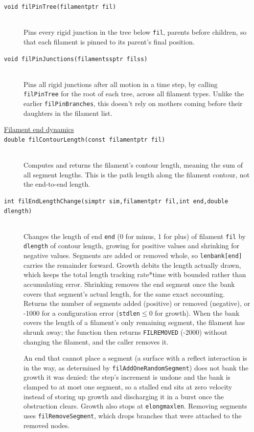 \documentclass {scrbook}
\newcommand {\ttt} {\texttt}
\begin{document}
\begin{description}
\item[\ttt{void filPinTree(filamentptr fil)}]
\hfill \\
Pins every rigid junction in the tree below \ttt{fil}, parents before children, so that each filament is pinned to its parent's final position.

\item[\ttt{void filPinJunctions(filamentssptr filss)}]
\hfill \\
Pins all rigid junctions after all motion in a time step, by calling \ttt{filPinTree} for the root of each tree, across all filament types. Unlike the earlier \ttt{filPinBranches}, this doesn't rely on mothers coming before their daughters in the filament list. %

\item[\underline{Filament end dynamics}]

\item[\ttt{double filContourLength(const filamentptr fil)}] %
\hfill \\
Computes and returns the filament's contour length, meaning the sum of all segment lengths. This is the path length along the filament contour, not the end-to-end length.

\item[\ttt{int filEndLengthChange(simptr sim,filamentptr fil,int end,double dlength)}] %
\hfill \\
Changes the length of end \ttt{end} (0 for minus, 1 for plus) of filament \ttt{fil} by \ttt{dlength} of contour length, growing for positive values and shrinking for negative values. Segments are added or removed whole, so \ttt{lenbank[end]} carries the remainder forward. Growth debits the length actually drawn, which keeps the total length tracking rate*time with bounded rather than accumulating error. Shrinking removes the end segment once the bank covers that segment's actual length, for the same exact accounting. Returns the number of segments added (positive) or removed (negative), or -1000 for a configuration error (\ttt{stdlen}$\leq 0$ for growth). When the bank covers the length of a filament's only remaining segment, the filament has shrunk away; the function then returns \ttt{FILREMOVED} (-2000) without changing the filament, and the caller removes it.

An end that cannot place a segment (a surface with a reflect interaction is in the way, as determined by \ttt{filAddOneRandomSegment}) does not bank the growth it was denied: the step's increment is undone and the bank is clamped to at most one segment, so a stalled end sits at zero velocity instead of storing up growth and discharging it in a burst once the obstruction clears. Growth also stops at \ttt{elongmaxlen}. Removing segments uses \ttt{filRemoveSegment}, which drops branches that were attached to the removed nodes.


\end{description}
\end{document}
